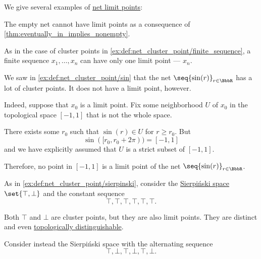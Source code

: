 \begin{example}\label{ex:def:net_limit_point}
  We give several examples of \hyperref[def:net_limit_point]{net limit points}:

  \begin{thmenum}
     The empty net cannot have limit points as a consequence of \cref{thm:eventually_in_implies_nonempty}.

     As in the case of cluster points in \cref{ex:def:net_cluster_point/finite_sequence}, a finite sequence \( x_1, \ldots, x_n \) can have only one limit point --- \( x_n \).

     We saw in \cref{ex:def:net_cluster_point/sin} that the net \( \seq{ \sin(r) }_{r \in \BbbR} \) has a lot of cluster points. It does not have a limit point, however.

    Indeed, suppose that \( x_0 \) is a limit point. Fix some neighborhood \( U \) of \( x_0 \) in the topological space \( [-1, 1] \) that is not the whole space.

    There exists some \( r_0 \) such that \( \sin(r) \in U \) for \( r \geq r_0 \). But
    \begin{equation*}
      \sin([r_0, r_0 + 2\pi)) = [-1, 1]
    \end{equation*}
    and we have explicitly assumed that \( U \) is a strict subset of \( [-1, 1] \).

    Therefore, no point in \( [-1, 1] \) is a limit point of the net \( \seq{ \sin(r) }_{r \in \BbbR} \).

     As in \cref{ex:def:net_cluster_point/sierpinski}, consider the \hyperref[def:sierpinski_space]{Sierpi\'nski space} \( \set{ \top, \bot } \) and the constant sequence
    \begin{equation*}
      \top, \top, \top, \top, \top, \top.
    \end{equation*}

    Both \( \top \) and \( \bot \) are cluster points, but they are also limit points. They are distinct and even \hyperref[def:topologically_indistinguishable]{topologically distinguishable}.

     Consider instead the Sierpi\'nski space with the alternating sequence
    \begin{equation*}
      \top, \bot, \top, \bot, \top, \bot.
    \end{equation*}


\end{thmenum}
\end{example}
